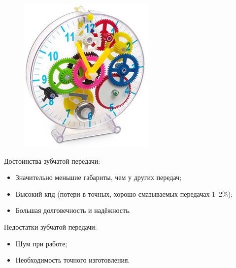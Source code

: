 \clearpage
\begin{figure}[h!]
	\begin{center}
		\includegraphics[width=1\linewidth]{chapters/chapter5/images/6}
		\caption{}
		\label{ris:image5x5}
	\end{center}
\end{figure}
Достоинства зубчатой передачи:

\begin{itemize}
	\item Значительно меньшие габариты, чем у других передач;	
	\item Высокий кпд (потери в точных, хорошо смазываемых передачах 1--2\%);	
	\item Большая долговечность и надёжность.\\
\end{itemize}
Недостатки зубчатой передачи:

\begin{itemize}
	\item Шум при работе;	
	\item Необходимость точного изготовления.\\
\end{itemize}

